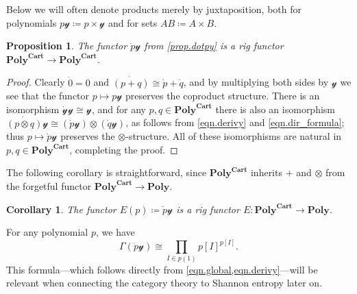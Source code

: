 \documentclass[11pt, one side, article]{memoir}
\theoremstyle{definition}
\theoremstyle{plain}
\newtheorem{proposition}[definitionx]{Proposition}
\newtheorem{corollary}[definitionx]{Corollary}
\newenvironment{example}
  {\pushQED{\qed}\renewcommand{\qedsymbol}{$\lozenge$}\examplex}
  {\popQED\endexamplex}
\newcommand{\Cat}[1]{\mathbf{#1}}%
\newcommand{\yon}{\mathcal{y}}
\newcommand{\poly}{\Cat{Poly}}
\newcommand{\polycart}{\poly^{\Cat{Cart}}}
\newcommand{\0}{\textsf{0}}
\newcommand{\1}{\tn{\textsf{1}}}
\begin{document}
Below we will often denote products merely by juxtaposition, both for polynomials $p\yon\coloneqq p\times \yon$ and for sets $AB\coloneqq A\times B$.

\begin{proposition}
The functor $\dot{p}\yon$ from \cref{prop.dotpy} is a rig functor $\polycart\to\polycart$. 
\end{proposition}
\begin{proof}
Clearly $\dot{0}=0$ and $\dot{(p+q)}\cong\dot{p}+\dot{q}$, and by multiplying both sides by $\yon$ we see that the functor $p\mapsto p\yon$ preserves the coproduct structure. There is an isomorphism $\dot{\yon}\yon\cong\yon$, and for any $p,q\in\polycart$ there is also an isomorphism $\dot{(p\otimes q)}\yon\cong(\dot{p}\yon)\otimes(\dot{q}\yon)$, as follows from \eqref{eqn.derivy} and \eqref{eqn.dir_formula}; thus $p\mapsto\dot{p}\yon$ preserves the $\otimes$-structure. All of these isomorphisms are natural in $p,q\in\polycart$, completing the proof.
\end{proof}

The following corollary is straightforward, since $\polycart$ inherits $+$ and $\otimes$ from the forgetful functor $\polycart\to\poly$.

\begin{corollary}\label{cor.E}
The functor $E(p)\coloneqq\dot{p}\yon$ is a rig functor $E\colon\polycart\to\poly$. 
\end{corollary}

\begin{example}\label{ex.global_E}
For any polynomial $p$, we have
\[
\Gamma(\dot{p}\yon)\cong\prod_{I\in p(1)}p[I]^{p[I]}.
\]
This formula---which follows directly from \cref{eqn.global,eqn.derivy}---will be relevant when connecting the category theory to Shannon entropy later on. 
\end{example}
\end{document}
